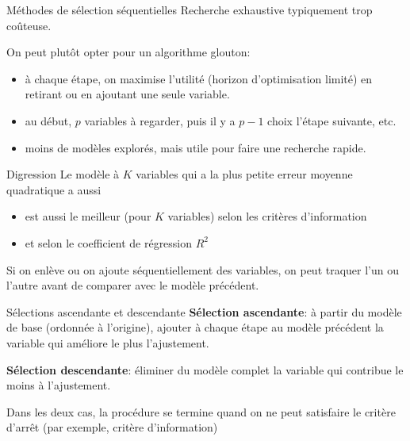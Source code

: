 \documentclass[
  ignorenonframetext,
]{beamer}
\providecommand{\tightlist}{%
  \setlength{\itemsep}{0pt}\setlength{\parskip}{0pt}}\usepackage{longtable,booktabs,array}
\begin{document}
\begin{frame}{Méthodes de sélection séquentielles}
\protect\hypertarget{muxe9thodes-de-suxe9lection-suxe9quentielles}{}
Recherche exhaustive typiquement trop coûteuse.

On peut plutôt opter pour un algorithme glouton:

\begin{itemize}
\tightlist
\item
  à chaque étape, on maximise l'utilité (horizon d'optimisation limité)
  en retirant ou en ajoutant une seule variable.
\item
  au début, \(p\) variables à regarder, puis il y a \(p-1\) choix
  l'étape suivante, etc.
\item
  moins de modèles explorés, mais utile pour faire une recherche rapide.
\end{itemize}
\end{frame}

\begin{frame}{Digression}
\protect\hypertarget{digression}{}
Le modèle à \(K\) variables qui a la plus petite erreur moyenne
quadratique a aussi

\begin{itemize}
\tightlist
\item
  est aussi le meilleur (pour \(K\) variables) selon les critères
  d'information
\item
  et selon le coefficient de régression \(R^2\)
\end{itemize}

Si on enlève ou on ajoute séquentiellement des variables, on peut
traquer l'un ou l'autre avant de comparer avec le modèle précédent.
\end{frame}

\begin{frame}{Sélections ascendante et descendante}
\protect\hypertarget{suxe9lections-ascendante-et-descendante}{}
\textbf{Sélection ascendante}: à partir du modèle de base (ordonnée à
l'origine), ajouter à chaque étape au modèle précédent la variable qui
améliore le plus l'ajustement.

\textbf{Sélection descendante}: éliminer du modèle complet la variable
qui contribue le moins à l'ajustement.

Dans les deux cas, la procédure se termine quand on ne peut satisfaire
le critère d'arrêt (par exemple, critère d'information)
\end{frame}
\end{document}
